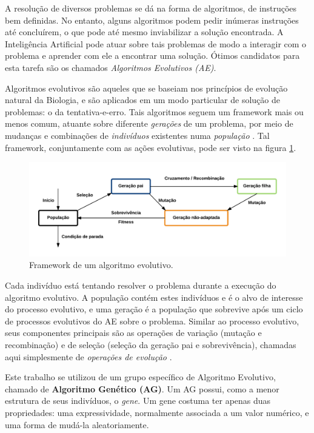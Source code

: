 \label{1_introducao}

A resolução de diversos problemas se dá na forma de algoritmos, de instruções bem definidas. No entanto, alguns algoritmos podem pedir inúmeras instruções até concluírem, o que pode até mesmo inviabilizar a solução encontrada. A Inteligência Artificial pode atuar sobre tais problemas de modo a interagir com o problema e aprender com ele a encontrar uma solução. Ótimos candidatos para esta tarefa são os chamados \emph{Algoritmos Evolutivos (AE)}.

Algoritmos evolutivos são aqueles que se baseiam nos princípios de evolução natural da Biologia, e são aplicados em um modo particular de solução de problemas: o da tentativa-e-erro. Tais algoritmos seguem um framework mais ou menos comum, atuante sobre diferente \emph{gerações} de um problema, por meio de mudanças e combinações de \emph{indivíduos} existentes numa \emph{população} \cite{eiben2003introduction}. Tal framework, conjuntamente com as ações evolutivas, pode ser visto na figura \ref{fig:evolution-framework}.

\begin{figure}[ht!]
    \centering \includegraphics[width=1.0\textwidth]{evolution-framework.png}
    \caption{Framework de um algoritmo evolutivo.}
    \label{fig:evolution-framework}
\end{figure}

Cada indivíduo está tentando resolver o problema durante a execução do algoritmo evolutivo. A população contém estes indivíduos e é o alvo de interesse do processo evolutivo, e uma geração é a população que sobrevive após um ciclo de processos evolutivos do \ac{AE} sobre o problema. Similar ao processo evolutivo, seus componentes principais são as operações de variação (mutação e recombinação) e de seleção (seleção da geração pai e sobrevivência), chamadas aqui simplesmente de \emph{operações de evolução} \cite{eiben2011parameter}.

Este trabalho se utilizou de um grupo específico de Algoritmo Evolutivo, chamado de \textbf{Algoritmo Genético (AG)}. Um AG possui, como a menor estrutura de seus indivíduos, o \emph{gene}. Um gene costuma ter apenas duas propriedades: uma expressividade, normalmente associada a um valor numérico, e uma forma de mudá-la aleatoriamente.

